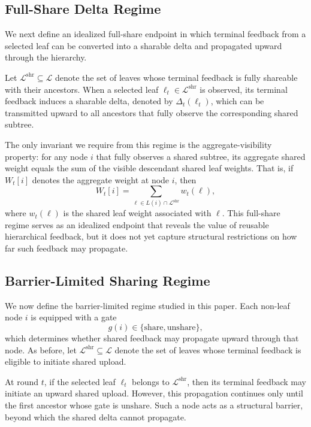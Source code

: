 \subsection{Full-Share Delta Regime}

We next define an idealized full-share endpoint in which terminal feedback from a selected leaf can be converted into a sharable delta and propagated upward through the hierarchy.

Let $\mathcal{L}^{\mathrm{shr}} \subseteq \mathcal{L}$ denote the set of leaves whose terminal feedback is fully shareable with their ancestors. When a selected leaf $\ell_t \in \mathcal{L}^{\mathrm{shr}}$ is observed, its terminal feedback induces a sharable delta, denoted by $\Delta_t(\ell_t)$, which can be transmitted upward to all ancestors that fully observe the corresponding shared subtree.

The only invariant we require from this regime is the aggregate-visibility property: for any node $i$ that fully observes a shared subtree, its aggregate shared weight equals the sum of the visible descendant shared leaf weights. That is, if $W_t[i]$ denotes the aggregate weight at node $i$, then
\[
W_t[i] = \sum_{\ell \in L(i) \cap \mathcal{L}^{\mathrm{shr}}} w_t(\ell),
\]
where $w_t(\ell)$ is the shared leaf weight associated with $\ell$. This full-share regime serves as an idealized endpoint that reveals the value of reusable hierarchical feedback, but it does not yet capture structural restrictions on how far such feedback may propagate.

\subsection{Barrier-Limited Sharing Regime}

We now define the barrier-limited regime studied in this paper. Each non-leaf node $i$ is equipped with a gate
\[
g(i) \in \{\mathrm{share}, \mathrm{unshare}\},
\]
which determines whether shared feedback may propagate upward through that node. As before, let $\mathcal{L}^{\mathrm{shr}} \subseteq \mathcal{L}$ denote the set of leaves whose terminal feedback is eligible to initiate shared upload.

At round $t$, if the selected leaf $\ell_t$ belongs to $\mathcal{L}^{\mathrm{shr}}$, then its terminal feedback may initiate an upward shared upload. However, this propagation continues only until the first ancestor whose gate is $\mathrm{unshare}$. Such a node acts as a structural barrier, beyond which the shared delta cannot propagate.

